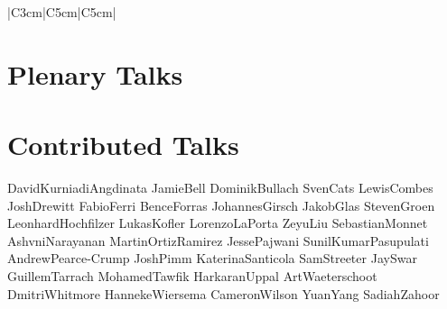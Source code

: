 \documentclass{ConferenceBooklet}
\theoremstyle{definition}
\begin{document}
\newpage
\phantom{}

\begin{scheduleday}{2}{|C{3cm}|C{5cm}|C{5cm}|}
\end{scheduleday}
\newpage


\section*{Plenary Talks}
\vspace{20pt}
\vspace{20pt}
\newpage

\section*{Contributed Talks}
              {DavidKurniadiAngdinata}
              {JamieBell}
              {DominikBullach}
              {SvenCats}
\newpage
{}
              {LewisCombes}
              {JoshDrewitt}
              {FabioFerri}
              {BenceForras}
\newpage
{}
              {JohannesGirsch}
              {JakobGlas}
              {StevenGroen}
              {LeonhardHochfilzer}
              {LukasKofler}
\newpage
{}
              {LorenzoLaPorta}
              {ZeyuLiu}
              {SebastianMonnet}
              {AshvniNarayanan}
              {MartinOrtizRamirez}
\newpage
{}
              {JessePajwani}
              {SunilKumarPasupulati}
              {AndrewPearce-Crump}
              {JoshPimm}
\newpage
{}
              {KaterinaSanticola}
              {SamStreeter}
              {JaySwar}
              {GuillemTarrach}
              {MohamedTawfik}
\newpage
{}
              {HarkaranUppal}
              {ArtWaeterschoot}
              {DmitriWhitmore}
              {HannekeWiersema}
              {CameronWilson}
\newpage
{}
              {YuanYang}
              {SadiahZahoor}
\end{document}

